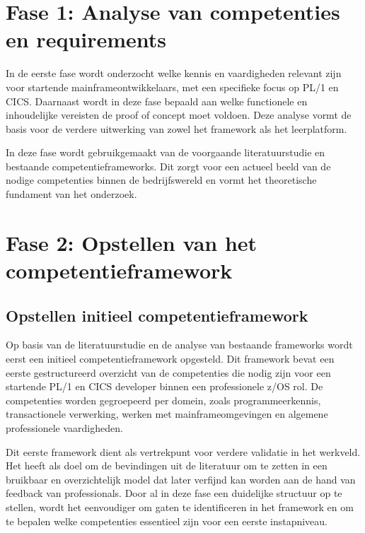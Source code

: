 \section{Fase 1: Analyse van competenties en requirements}%
\label{sec:analyse-van-competenties-en-requirements}

In de eerste fase wordt onderzocht welke kennis en vaardigheden relevant zijn voor startende mainframeontwikkelaars, met een specifieke focus op PL/1 en CICS. 
Daarnaast wordt in deze fase bepaald aan welke functionele en inhoudelijke vereisten de proof of concept moet voldoen.
Deze analyse vormt de basis voor de verdere uitwerking van zowel het framework als het leerplatform.

In deze fase wordt gebruikgemaakt van de voorgaande literatuurstudie en bestaande competentieframeworks. 
Dit zorgt voor een actueel beeld van de nodige competenties binnen de bedrijfswereld en vormt het theoretische fundament van het onderzoek.

\section{Fase 2: Opstellen van het competentieframework}%
\label{sec:opstellen-competentieframework}

\subsection{Opstellen initieel competentieframework}%
\label{sec:Opstellen-initieel-competentieframework}

Op basis van de literatuurstudie en de analyse van bestaande frameworks wordt eerst een initieel competentieframework opgesteld. 
Dit framework bevat een eerste gestructureerd overzicht van de competenties die nodig zijn voor een startende PL/1 en CICS developer binnen een professionele z/OS rol. 
De competenties worden gegroepeerd per domein, zoals programmeerkennis, transactionele verwerking, werken met mainframeomgevingen en algemene professionele vaardigheden.

Dit eerste framework dient als vertrekpunt voor verdere validatie in het werkveld. 
Het heeft als doel om de bevindingen uit de literatuur om te zetten in een bruikbaar en overzichtelijk model dat later verfijnd kan worden aan de hand van feedback van professionals. 
Door al in deze fase een duidelijke structuur op te stellen, wordt het eenvoudiger om gaten te identificeren in het framework en om te bepalen welke competenties essentieel zijn voor een eerste instapniveau.

